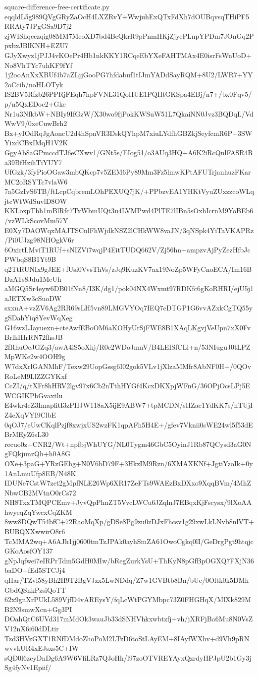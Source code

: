 \documentclass[11pt]{article}
\theoremstyle{definition}
\theoremstyle{remark}
\begin{document}
\begin{filecontents*}[overwrite]{square-difference-free-certificate.py}
eqqldL5g989QVgGRyZaOcH4LXZRvY+WwjuhExQTxFdXh7dOUBqvsqTHiPF5RRAty7JPgGSa9D7j2
zjWIShqcczqig08MM7MeoXD7bd4BeQkrR9pPnmHKjZjyePLnpYPDm7JOnGq2PpxbxJBlKNH+EZU7
GJyXwyz1jPJJ4vKOePr4Hb1nkKKY1RCqeEbYXeFAHTMAx4E0isrFsWnUoD+No8VhTYc7uhKF9fYf
1j2ooAnXxXBUf4b7aZLjjGooPG7hfdabuf1tIJmYADdSayRQM+8U2/LWR7+YY2oCcib/noHLOTyk
IS2BV5Rfzb26PPRjFEqh7hpFVNL31QoHUE1PQHtGKSpa4EBj/n7+/bx0Fqv5/p/n5QxEDoc2+Gke
Nr1u3NfkbW+NBIy9IfGzW/X30wo9fjPokKWSuW51L7QkaiNN0Jvz3BQDqL/VdWwV9/0xeCuwBrh2
Bx+yIOdRqJgAoncU2d4hSpnVR3DskQYhpM7xiuLYdfhGBZkjSeyfcmR6P+3SWYixdCBxIMqH1V2K
GgyAb8aGPmccdTJ6eCXwv1/GNt5s/EIog51/o3AUq3HQ+A6K2iRcQnlFASR4Ra39BfHzihTiYUY7
UfGzk/3fyPioOGaw3mbQKcp7v5ZEM6Py89Mm3Fz5lmwKPtAFUTrjanhuzFKarMC2oRSYTc7vlaW6
7a5GzIvS6TB/ftLcpCqbremLOhPEXUQ7jK/+PPbzvEA1YHKtVyuZUxzzcoWLqjtcWtWdSuvlD8OW
KKLoxpThh1mBlRfc7TxWbmUQt3u4LVMPwd4PlTE7lIBn5sOxhIcrnM9YoBEb6/vzWLkScovMm57Y
E0Xy7DAOWqxMAJTSCnlFhWjdkNSZ2lCHkWW8vaJN/3qNSpk4YiTaVKAPRz/Pi0UJzg98NHOgkV6r
6OxirtLMviT1RUf+sNIZVi7wqjP4EitTUDQ662V/Zj56hn+ampzvAjPyZezHfbJcPWbqS8B1Yt9B
q2TtRUNIx9gJEE+fUsi0VvsThVs/zJq9KuzKV7ax19NoZp5WFyCnoECA/Im16BDzATs8Jdu1MeUh
aMGQ5Sr4eyw6DB01fNn8/I3K/dg1/pok04NX4Wxmt97RDKfc6gKoRHRI/ejU5j1aJETXw3cSuoDW
sxxuA+vzZV6Ag2RR69sLH5vn89LMGVYOq7IEQ7cDTGP1G6vvAZxkCgTQ55ygSDahYiq8YevWqXeg
G16wzLJayuexn+cteAwfEBoOM6aKOHyUrSjFWE8B1XAqLKgvjVeUpn7xX0FvBrlhIHrRN72fhsJB
2fRhuOeJGZq3/awA4iS5oXhj/R0c2WDoJmnV/B4LEISfCLl+n/53NIuguJ0tLPZMpWKe2w4OOH9g
W7dxXrlGANMhF/Texw29UopGssg6I02gok5VLv1jXlzaMMfr8AbNF0H+/0QOvRoLeM9LlZZGYKxf
CcZI/q/tXFr8hHRV2lgv97x6Cb2nTthHYGf4KcxDKXpjWFnG/36OPjOcsLPj5EWCGIKPbGvaxtlu
E4wkr4eZ3ImapfitI3zPHJW118aX5ijE9ABW7+tpMCDN/sHZae1YdKK7s/hTUjIZ4cXqVYI9ClbE
0qOJ7/eUwCKqlPzjf8xwjxUS2wzFK1qpAFh5H4E+/gfev7Vknii0sWE24wl5f53dEBrMEyZ6sL30
recuo0z+CNR2/Wt+npfbjWhUYG/NL0Tygm46GbC5OyinJ1Rb87QCysd3aG0NgFQkjunzQh+h0A8G
OXe+3paG+YRzGEhg+N0V6bD79F+3HkzIM9Rzn/6XMAXKNf+JgtiYzoIk+0y1AnLmuUfp8EB/N48K
IDUNe7CstW7zct2gMpfNLE26Wp6XR17ZeFTs9WAEzBxDXxo9XqqBVm/4MhZNbwCB2MVtnO0rCs72
NH8TxxTMQPCEmv+JyvQpPhnZT5VvcLWCu6JZqlnJ7EBqxKjFscysx/9lXoAAhwyeqZqYwcxCqZKM
8ww8DQwT54bfC+72RaoMqXp/gDSe8Pg9zu0zDJxFhcsv1g29xwLkLNvb8nlVT+BUBQXXwwirO8r6
TcMMA2wq+A6AJh1jj0600tmTzJPAk0ayhSmZA61OwoCgkq0lI/GeDrgPgt9htqjcGKoAosfOY137
gNpJqfwei7eIRPrTdm5GdH0MIw/bRegZurkYsU+ThKyN8pGfBpOGXQ7FXjN36baDO+fEd5STCJj4
qHar/TZvl58yBh2H9T2BgVJzx5LwNDdq/Z7w1GVBtb8Bn/bUe/0Oltk0k5DMhGbdQSnkPzsiQoTT
62x9gnXrPUkL589VjfD4vAREysY/fqLcWtPGYMbpc73Z0FHGHqX/MlXk829MB2N9smwXcn+Gg3PI
DOahQtC6UVd317mMdOk3wauJb33dSNHVhkxwbtzfj+vh/jXRFjBa6Mu8N0VsZV12nX6i60dDLtir
Tzd3HVzGXT1RNfDMdoZhoPoM2LTzD6toStLAyEM+8IAyfWXhv+d9Vh9pRNwvvkUR4xEJsxs5C+IW
sQD0l6zcyDnDg6A9W6VfiLRz7QJoHh/l97zoOTVREYAyxQzrdyHPJpU2b1Gy3jSg4fyNv1Epiif/

\end{filecontents*}
\end{document}
